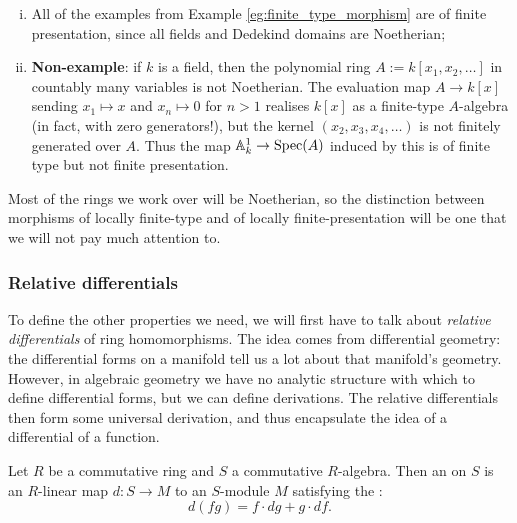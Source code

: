 \pagebreak

\begin{eg}
	\begin{enumerate}[(i)]
		\item All of the examples from Example \ref{eg:finite_type_morphism} are of finite presentation, since all fields and Dedekind domains are Noetherian;
		\item \textbf{Non-example}: if $k$ is a field, then the polynomial ring $A := k[x_1, x_2, \ldots]$ in countably many variables is not Noetherian. The evaluation map $A \to k[x]$ sending $x_1 \mapsto x$ and $x_n  \mapsto 0$ for $n>1$ realises $k[x]$ as a finite-type $A$-algebra (in fact, with zero generators!), but the kernel $(x_2, x_3, x_4, \ldots)$ is not finitely generated over $A$. Thus the map $\mathbb{A}^1_k \to \mathrm{Spec}(A)$ induced by this is of finite type but not finite presentation.
	\end{enumerate}
\end{eg}

Most of the rings we work over will be Noetherian, so the distinction between morphisms of locally finite-type and of locally finite-presentation will be one that we will not pay much attention to.

\subsubsection{Relative differentials}
\label{subsubsec:2_4_2_relative_differentials}
To define the other properties we need, we will first have to talk about \emph{relative differentials} of ring homomorphisms. The idea comes from differential geometry: the differential forms on a manifold tell us a lot about that manifold's geometry. However, in algebraic geometry we have no analytic structure with which to define differential forms, but we can define derivations. The relative differentials then form some universal derivation, and thus encapsulate the idea of a differential of a function.

\begin{defn}
	Let $R$ be a commutative ring and $S$ a commutative $R$-algebra. Then an  on $S$ is an $R$-linear map $d : S \to M$ to an $S$-module $M$ satisfying the :
	\[
		d(fg) = f\cdot dg + g\cdot d\!f.
	\]
\end{defn}

